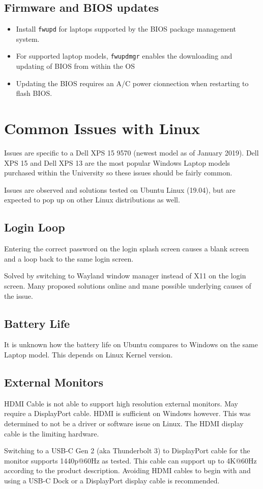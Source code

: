 \documentclass[8pt,letterpaper,twocolumn]{article}
\begin{document}
\subsection{Firmware and BIOS updates}

\begin{itemize}
	\item Install \texttt{fwupd} for laptops supported by the BIOS package management system.
	\item For supported laptop models, \texttt{fwupdmgr} enables the downloading and updating of BIOS from within the OS
	\item Updating the BIOS requires an A/C power cionnection when restarting to flash BIOS.
\end{itemize}

\section{Common Issues with Linux}

Issues are specific to a Dell XPS 15 9570 (newest model as of January 2019). Dell XPS 15 and Dell XPS 13 are the most popular Windows Laptop models purchased within the University so these issues should be fairly common.

Issues are observed and solutions tested on Ubuntu Linux (19.04), but are expected to pop up on other Linux distributions as well.

\subsection{Login Loop}

Entering the correct password on the login splash screen causes a blank screen and a loop back to the same login screen.

Solved by switching to Wayland window manager instead of X11 on the login screen. Many proposed solutions online and mane possible underlying causes of the issue.

\subsection{Battery Life}

It is unknown how the battery life on Ubuntu compares to Windows on the same Laptop model. This depends on Linux Kernel version.

\subsection{External Monitors}

HDMI Cable is not able to support high resolution external monitors. May require a DisplayPort cable. HDMI is sufficient on Windows however. This was determined to not be a driver or software issue on Linux. The HDMI display cable is the limiting hardware.

Switching to a USB-C Gen 2 (aka Thunderbolt 3) to DisplayPort cable for the monitor supports 1440p@60Hz as tested. This cable can support up to 4K@60Hz according to the product description. Avoiding HDMI cables to begin with and using a USB-C Dock or a DisplayPort display cable is recommended.
\end{document}
